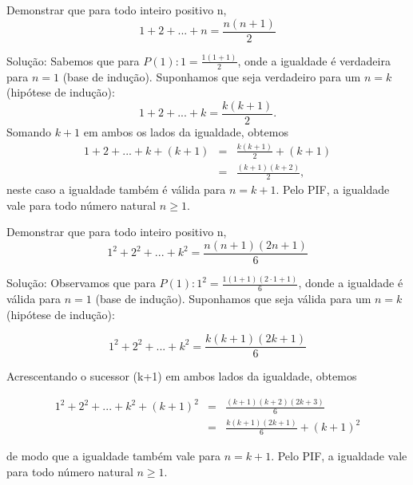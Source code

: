 \begin{exem}\label{exemplo-ind1}
	Demonstrar que para todo inteiro positivo n,
\begin{equation*}
	1 + 2 + ... + n = \frac{n(n+1)}{2}
\end{equation*}
\end{exem}

\noindent Solução: Sabemos que para $P(1): 1 = \frac{1(1+1)}{2}$, onde a igualdade é verdadeira para $n = 1$ (base de indução). 
Suponhamos que seja verdadeiro para um $n = k$ (hipótese de indução):
\begin{equation*}
	1 + 2 + ... + k = \frac{k(k+1)}{2}.
\end{equation*}
\noindent Somando $k+1$ em ambos os lados da igualdade, obtemos
\begin{eqnarray*}
	1 + 2 + ... + k + (k+1) &=& \frac{k(k+1)}{2} + (k+1) \\
	&=& \frac{(k+1)(k+2)}{2},
\end{eqnarray*}
\noindent neste caso a igualdade também é válida para $n = k+1$. Pelo PIF, a igualdade vale para todo número natural $n \geq 1$.

\begin{exem}
	Demonstrar que para todo inteiro positivo n,
	\begin{equation*}
	1^2 + 2^2 + ... + k^2 = \frac{n(n+1)(2n+1)}{6}
	\end{equation*}
\end{exem}

\noindent Solução: Observamos que para $P(1): 1^2 = \frac{1(1+1)(2 \cdot 1 + 1)}{6}$, donde a igualdade é válida para $n=1$ (base de indução). Suponhamos que seja válida para um $n=k$ (hipótese de indução):

\begin{equation*}
	1^2 + 2^2 + ... + k^2 = \frac{k(k+1)(2k+1)}{6}
\end{equation*}

\noindent Acrescentando o sucessor (k+1) em ambos lados da igualdade, obtemos 

\begin{eqnarray*}
	1^2 + 2^2 + ... + k^2 + (k+1)^2 &=& \frac{(k+1)(k+2)(2k+3)}{6} \\
	 &=& \frac{k(k+1)(2k+1)}{6} + (k+1)^2 
\end{eqnarray*}

\noindent de modo que a igualdade também vale para $n = k + 1$. Pelo PIF, a igualdade vale para todo número natural $n \geq 1$.

